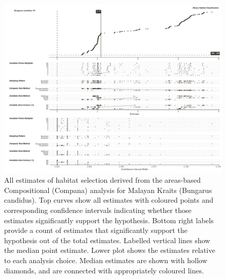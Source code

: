 \documentclass[10pt,a4paper]{article}
\begin{document}
\begin{figure}
\includegraphics[width=1\linewidth]{../../figures/specCurve_Bungarus candidus_area} \caption{All estimates of habitat selection derived from the areas-based Compositional (Compana) analysis for Malayan Kraits (Bungarus candidus). Top curves show all estimates with coloured points and corresponding confidence intervals indicating whether those estimates significantly support the hypothesis. Bottom right labels provide a count of estimates that significantly support the hypothesis out of the total estimates. Labelled vertical lines show the median point estimate. Lower plot shows the estimates relative to each analysis choice. Median estimates are shown with hollow diamonds, and are connected with appropriately coloured lines.}\label{fig:specCurveAreaBUCA}
\end{figure}
\end{document}
